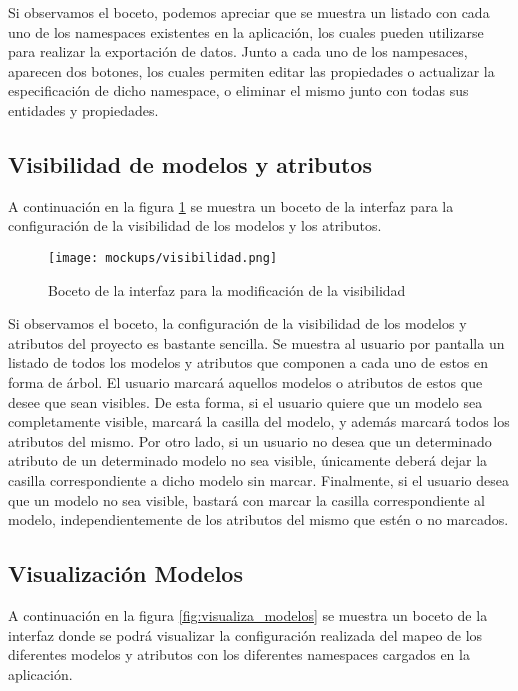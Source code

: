 Si observamos el boceto, podemos apreciar que se muestra un listado con cada uno
de los namespaces existentes en la aplicación, los cuales pueden utilizarse para
realizar la exportación de datos. Junto a cada uno de los nampesaces, aparecen
dos botones, los cuales permiten editar las propiedades o actualizar la
especificación de dicho namespace, o eliminar el mismo junto con todas sus
entidades y propiedades.

\subsection{Visibilidad de modelos y atributos}

A continuación en la figura \ref{fig:visibilidad} se muestra un boceto de
la interfaz para la configuración de la visibilidad de los modelos y los
atributos.

\begin{figure}[H]
    \begin{center}
        \texttt{[image: mockups/visibilidad.png]}
    \end{center}
    \caption{Boceto de la interfaz para la modificación de la visibilidad}
    \label{fig:visibilidad}
\end{figure}

Si observamos el boceto, la configuración de la visibilidad de los modelos y
atributos del proyecto es bastante sencilla. Se muestra al usuario por pantalla
un listado de todos los modelos y atributos que componen a cada uno de estos en
forma de árbol. El usuario marcará aquellos modelos o atributos de estos que
desee que sean visibles. De esta forma, si el usuario quiere que un modelo sea
completamente visible, marcará la casilla del modelo, y además marcará todos los
atributos del mismo. Por otro lado, si un usuario no desea que un determinado
atributo de un determinado modelo no sea visible, únicamente deberá dejar la
casilla correspondiente a dicho modelo sin marcar. Finalmente, si el usuario
desea que un modelo no sea visible, bastará con marcar la casilla
correspondiente al modelo, independientemente de los atributos del mismo que
estén o no marcados.

\subsection{Visualización Modelos}

A continuación en la figura \ref{fig:visualiza_modelos} se muestra un boceto de
la interfaz donde se podrá visualizar la configuración realizada del mapeo de
los diferentes modelos y atributos con los diferentes namespaces cargados en la
aplicación.

